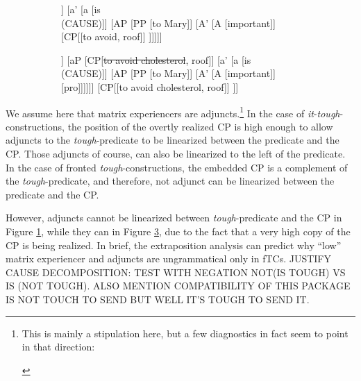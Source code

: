 \documentclass[11pt]{article}
\begin{document}
\begin{figure}[H]
	\centering
	\begin{subfigure}[t]{.45\linewidth}
		\centering
		\begin{forest}
			[aP [DP [Cholesterol]] [a' [a [{is \\ (CAUSE)}]] [AP [PP [to Mary]] [A' [A [important]] [CP[[to avoid, roof]] ]]]]]
		\end{forest}\label{tree:fronted-tough}
	\end{subfigure}
	\hfill
	\begin{subfigure}[t]{.45\linewidth}
		\centering
		\begin{forest}
			[[TP[[{\sout{to avoid cholesterol} \\ It}, roof]] [aP [CP[{\sout{to avoid cholesterol}}, roof]] [a' [a [{is \\ (CAUSE)}]] [AP [PP [to Mary]] [A' [A [important]] [pro]]]]]] [CP[[to avoid cholesterol, roof]] ]]
		\end{forest}\label{tree:it-tough}
	\end{subfigure}
\end{figure}
We assume here that matrix experiencers are adjuncts.\footnote{This is mainly a stipulation here, but a few diagnostics in fact seem to point in that direction:
\begin{exe}
\end{exe}} In the case of \textit{it}-\textit{tough}-constructions, the position of the overtly realized CP is high enough to allow adjuncts to the \textit{tough}-predicate to be linearized between the predicate and the CP. Those adjuncts of course, can also be linearized to the left of the predicate. In the case of fronted \textit{tough}-constructions, the embedded CP is a complement of the \textit{tough}-predicate, and therefore, not adjunct can be linearized between the predicate and the CP.



However, adjuncts cannot be linearized between \textit{tough}-predicate and the CP in Figure \ref{tree:fronted-tough}, while they can in Figure \ref{tree:it-tough}, due to the fact that a very high copy of the CP is being realized. In brief, the extraposition analysis can predict why ``low'' matrix experiencer and adjuncts are ungrammatical only in fTCs.
JUSTIFY CAUSE DECOMPOSITION: TEST WITH NEGATION NOT(IS TOUGH) VS IS (NOT TOUGH). ALSO MENTION COMPATIBILITY OF THIS PACKAGE IS NOT TOUCH TO SEND BUT WELL IT'S TOUGH TO SEND IT.
\end{document}
